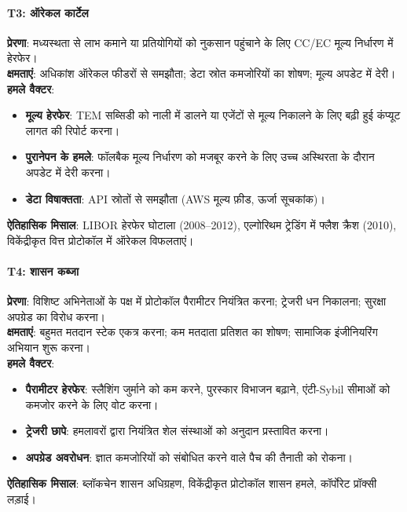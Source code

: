 \documentclass[11pt]{article}
\begin{document}
\begin{itemize}[noitemsep]
\begin{itemize}[noitemsep]
\begin{itemize}[noitemsep]
\begin{itemize}[noitemsep]
\paragraph{T3: ऑरेकल कार्टेल}
\textbf{प्रेरणा}: मध्यस्थता से लाभ कमाने या प्रतियोगियों को नुकसान पहुंचाने के लिए CC/EC मूल्य निर्धारण में हेरफेर।\\
\textbf{क्षमताएं}: अधिकांश ऑरेकल फीडरों से समझौता; डेटा स्रोत कमजोरियों का शोषण; मूल्य अपडेट में देरी।\\
\textbf{हमले वैक्टर}:
\begin{itemize}[noitemsep]
  \item \textbf{मूल्य हेरफेर}: TEM सब्सिडी को नाली में डालने या एजेंटों से मूल्य निकालने के लिए बढ़ी हुई कंप्यूट लागत की रिपोर्ट करना।
  \item \textbf{पुरानेपन के हमले}: फॉलबैक मूल्य निर्धारण को मजबूर करने के लिए उच्च अस्थिरता के दौरान अपडेट में देरी करना।
  \item \textbf{डेटा विषाक्तता}: API स्रोतों से समझौता (AWS मूल्य फ़ीड, ऊर्जा सूचकांक)।
\end{itemize}
\textbf{ऐतिहासिक मिसाल}: LIBOR हेरफेर घोटाला (2008--2012), एल्गोरिथम ट्रेडिंग में फ्लैश क्रैश (2010), विकेंद्रीकृत वित्त प्रोटोकॉल में ऑरेकल विफलताएं।

\paragraph{T4: शासन कब्जा}
\textbf{प्रेरणा}: विशिष्ट अभिनेताओं के पक्ष में प्रोटोकॉल पैरामीटर नियंत्रित करना; ट्रेजरी धन निकालना; सुरक्षा अपग्रेड का विरोध करना।\\
\textbf{क्षमताएं}: बहुमत मतदान स्टेक एकत्र करना; कम मतदाता प्रतिशत का शोषण; सामाजिक इंजीनियरिंग अभियान शुरू करना।\\
\textbf{हमले वैक्टर}:
\begin{itemize}[noitemsep]
  \item \textbf{पैरामीटर हेरफेर}: स्लैशिंग जुर्माने को कम करने, पुरस्कार विभाजन बढ़ाने, एंटी-Sybil सीमाओं को कमजोर करने के लिए वोट करना।
  \item \textbf{ट्रेजरी छापे}: हमलावरों द्वारा नियंत्रित शेल संस्थाओं को अनुदान प्रस्तावित करना।
  \item \textbf{अपग्रेड अवरोधन}: ज्ञात कमजोरियों को संबोधित करने वाले पैच की तैनाती को रोकना।
\end{itemize}
\textbf{ऐतिहासिक मिसाल}: ब्लॉकचेन शासन अधिग्रहण, विकेंद्रीकृत प्रोटोकॉल शासन हमले, कॉर्पोरेट प्रॉक्सी लड़ाई।


\end{itemize}
\end{itemize}
\end{itemize}
\end{itemize}
\end{document}
